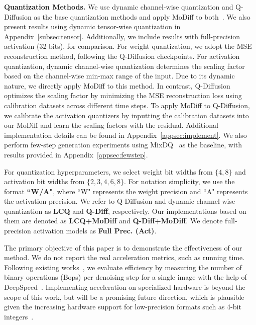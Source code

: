 \textbf{Quantization Methods.} We use dynamic channel-wise quantization and Q-Diffusion as the base quantization methods and apply MoDiff to both~\citep{dettmers2022gpt3,li2023q}. We also present results using dynamic tensor-wise quantization in Appendix~\ref{subsec:tensor}. Additionally, we include results with full-precision activation (32 bits), for comparison. For weight quantization, we adopt the MSE reconstruction method, following the Q-Diffusion checkpoints. For activation quantization, dynamic channel-wise quantization determines the scaling factor based on the channel-wise min-max range of the input. Due to its dynamic nature, we directly apply MoDiff to this method. In contrast, Q-Diffusion optimizes the scaling factor by minimizing the MSE reconstruction loss using calibration datasets across different time steps. To apply MoDiff to Q-Diffusion, we calibrate the activation quantizers by inputting the calibration datasets into our MoDiff and learn the scaling factors with the residual. Additional implementation details can be found in Appendix~\ref{appsec:implement}. We also perform few-step generation experiments using MixDQ~\citep{zhao2024mixdq} as the baseline, with results provided in Appendix~\ref{appsec:fewstep}.

For quantization hyperparameters, we select weight bit widths from \(\{4, 8\}\) and activation bit widths from \(\{2, 3, 4, 6, 8\}\). For notation simplicity, we use the format \textbf{``W/A"}, where ``W" represents the weight precision and ``A" represents the activation precision. We refer to Q-Diffusion and dynamic channel-wise quantization as \textbf{LCQ} and \textbf{Q-Diff}, respectively. Our implementations based on them are denoted as \textbf{LCQ+MoDiff} and \textbf{Q-Diff+MoDiff}. We denote full-precision activation models as \textbf{Full Prec. (Act)}.

\begin{remark}
The primary objective of this paper is to demonstrate the effectiveness of our method. We do not report the real acceleration metrics, such as running time. Following existing works~\citep{li2023q,wang2024towards}, we evaluate efficiency by measuring the number of binary operations (Bops) per denoising step for a single image with the help of DeepSpeed~\citep{song2023deepspeed4science}. Implementing acceleration on specialized hardware is beyond the scope of this work, but will be a promising future direction, which is plausible given the increasing hardware support for low-precision formats such as 4-bit integers~\citep{nvidiaint4}.
\end{remark}

